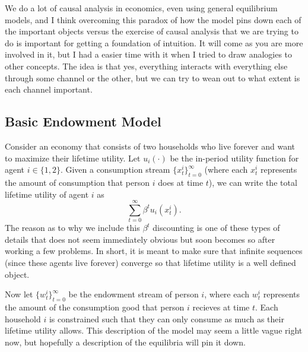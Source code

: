 \documentclass[11pt,english]{article}
\begin{document}
We do a lot of causal analysis in economics, even using general equilibrium models, and I think overcoming this paradox of how the model pins down each of the important objects versus the exercise of causal analysis that we are trying to do is important for getting a foundation of intuition. It will come as you are more involved in it, but I had a easier time with it when I tried to draw analogies to other concepts. The idea is that yes, everything interacts with everything else through some channel or the other, but we can try to wean out to what extent is each channel important.


\subsection{Basic Endowment Model}

Consider an economy that consists of two households who live forever and want to maximize their lifetime utility. Let $u_i(\cdot)$ be the in-period utility function for agent $i\in \{1,2\}$. Given a consumption stream $\{x_t^i\}_{t=0}^\infty$ (where each $x_t^i$ represents the amount of consumption that person $i$ does at time $t$), we can write the total lifetime utility of agent $i$ as $$\sum_{t=0}^\infty \beta^t u_i(x^i_t).$$
The reason as to why we include this $\beta^t$ discounting is one of these types of details that does not seem immediately obvious but soon becomes so after working a few problems. In short, it is meant to make sure that infinite sequences (since these agents live forever) converge so that lifetime utility is a well defined object.

Now let $\{w_t^i\}_{t=0}^\infty$ be the endowment stream of person $i$, where each $w_t^i$ represents the amount of the consumption good that person $i$ recieves at time $t$. Each household $i$ is constrained such that they can only consume as much as their lifetime utility allows.  This description of the model may seem a little vague right now, but hopefully a description of the equilibria will pin it down.
\end{document}
